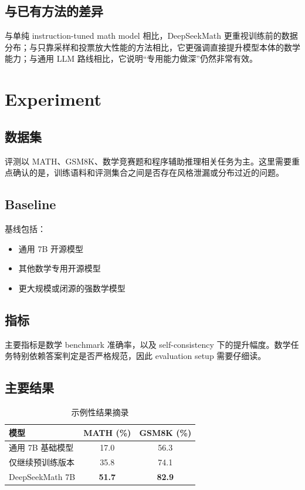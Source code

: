 \documentclass[UTF8,fontset=fandol,zihao=-4]{ctexart}
\begin{document}
\subsection{与已有方法的差异}
与单纯 instruction-tuned math model 相比，DeepSeekMath 更重视训练前的数据分布；与只靠采样和投票放大性能的方法相比，它更强调直接提升模型本体的数学能力；与通用 LLM 路线相比，它说明“专用能力做深”仍然非常有效。

\section{Experiment}

\subsection{数据集}
评测以 MATH、GSM8K、数学竞赛题和程序辅助推理相关任务为主。这里需要重点确认的是，训练语料和评测集合之间是否存在风格泄漏或分布过近的问题。

\subsection{Baseline}
基线包括：
\begin{itemize}
  \item 通用 7B 开源模型
  \item 其他数学专用开源模型
  \item 更大规模或闭源的强数学模型
\end{itemize}

\subsection{指标}
主要指标是数学 benchmark 准确率，以及 self-consistency 下的提升幅度。数学任务特别依赖答案判定是否严格规范，因此 evaluation setup 需要仔细读。

\subsection{主要结果}
\begin{table}[H]
\centering
\caption{示例性结果摘录}
\begin{tabular}{lcc}
\toprule
模型 & MATH (\%) & GSM8K (\%) \\
\midrule
通用 7B 基础模型 & 17.0 & 56.3 \\
仅继续预训练版本 & 35.8 & 74.1 \\
DeepSeekMath 7B & \textbf{51.7} & \textbf{82.9} \\
\bottomrule
\end{tabular}
\end{table}
\end{document}
